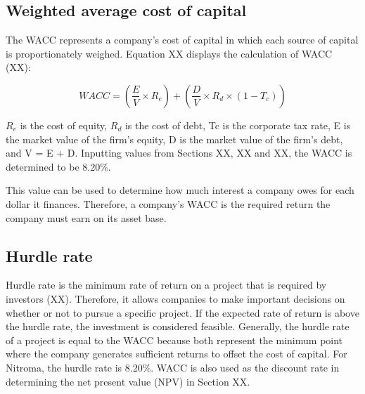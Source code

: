 \subsection{Weighted average cost of capital}
The WACC represents a company’s cost of capital in which each source of capital is proportionately weighed. Equation XX displays the calculation of WACC (XX):

\begin{equation}
    WACC=\left(\frac{E}{V}\times R_{e}\right)+\left(\frac{D}{V}\times R_{d}\times (1-T_{c})\right)
\end{equation}

$R_{e}$ is the cost of equity, $R_{d}$ is the cost of debt, Tc is the corporate tax rate, E is the market value of the firm’s equity, D is the market value of the firm’s debt, and V = E + D. Inputting values from Sections XX, XX and XX, the WACC is determined to be 8.20\%. 

This value can be used to determine how much interest a company owes for each dollar it finances. Therefore, a company’s WACC is the required return the company must earn on its asset base. 

\subsection{Hurdle rate}
Hurdle rate is the minimum rate of return on a project that is required by investors (XX). Therefore, it allows companies to make important decisions on whether or not to pursue a specific project. If the expected rate of return is above the hurdle rate, the investment is considered feasible. Generally, the hurdle rate of a project is equal to the WACC because both represent the minimum point where the company generates sufficient returns to offset the cost of capital. For Nitroma, the hurdle rate is 8.20\%. WACC is also used as the discount rate in determining the net present value (NPV) in Section XX.